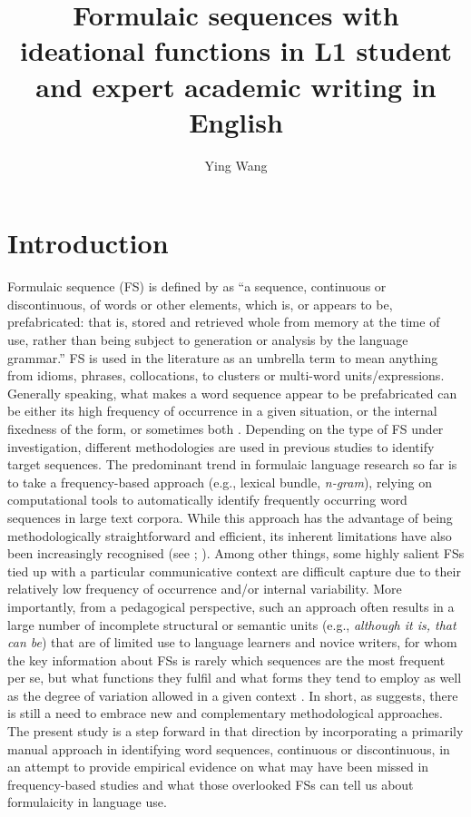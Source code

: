 \documentclass[output=paper]{langscibook}
\author{Ying Wang\affiliation{Karlstad University}\orcid{}}
\title[Formulaic sequences in L1 student and expert academic writing in English]{Formulaic sequences with ideational functions in L1 student and expert academic writing in English}
\begin{document}
\maketitle 


\section{Introduction}

Formulaic sequence (FS) is defined by \citet[9]{Wray2002} as “a sequence, continuous or discontinuous, of words or other elements, which is, or appears to be, prefabricated: that is, stored and retrieved whole from memory at the time of use, rather than being subject to generation or analysis by the language grammar.” FS is used in the literature as an umbrella term to mean anything from idioms, phrases, collocations, to clusters or multi-word units/expressions. Generally speaking, what makes a word sequence appear to be prefabricated can be either its high frequency of occurrence in a given situation, or the internal fixedness of the form, or sometimes both \citep{Siyanova-Chanturia2013}. Depending on the type of FS under investigation, different methodologies are used in previous studies to identify target sequences. The predominant trend in formulaic language research so far is to take a frequency-based approach (e.g., lexical bundle, \textit{n-gram}), relying on computational tools to automatically identify frequently occurring word sequences in large text corpora. While this approach has the advantage of being methodologically straightforward and efficient, its inherent limitations have also been increasingly recognised (see \citealt{ÄdelErman2012}; \citealt{Wang2018}). Among other things, some highly salient FSs tied up with a particular communicative context are difficult capture due to their relatively low frequency of occurrence and/or internal variability. More importantly, from a pedagogical perspective, such an approach often results in a large number of incomplete structural or semantic units (e.g., \textit{although it is, that can be}) that are of limited use to language learners and novice writers, for whom the key information about FSs is rarely which sequences are the most frequent per se, but what functions they fulfil and what forms they tend to employ as well as the degree of variation allowed in a given context \citep{DurrantMathews-Aydınlı2011}. In short, as \citet{Biber2009} suggests, there is still a need to embrace new and complementary methodological approaches. The present study is a step forward in that direction by incorporating a primarily manual approach in identifying word sequences, continuous or discontinuous, in an attempt to provide empirical evidence on what may have been missed in frequency-based studies and what those overlooked FSs can tell us about formulaicity in language use. 
\end{document}

